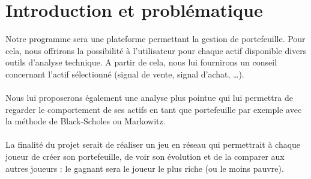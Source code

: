 \chapter{Introduction et problématique}
Notre programme sera une plateforme permettant la gestion de portefeuille. Pour cela, nous offrirons la possibilité à l’utilisateur pour chaque actif disponible divers outils d’analyse technique. A partir de cela, nous lui fournirons un conseil concernant l’actif sélectionné (signal de vente, signal d’achat, …). \\ \\
	Nous lui proposerons également une analyse plus pointue qui lui permettra de regarder le comportement de ses actifs en tant que portefeuille par exemple avec la méthode de Black-Scholes ou Markowitz. \\ \\
	La finalité du projet serait de réaliser un jeu en réseau qui permettrait à chaque joueur de créer son portefeuille, de voir son évolution et de la comparer aux autres joueurs : le gagnant sera le joueur le plus riche (ou le moins pauvre). 

